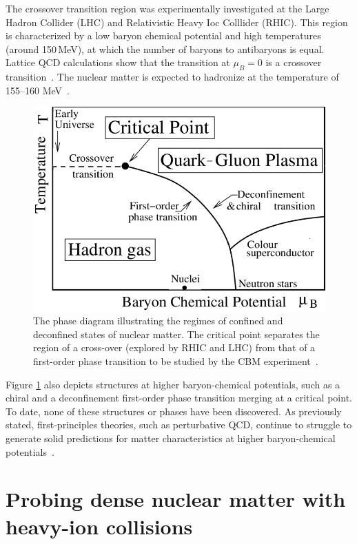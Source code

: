 The crossover transition region was experimentally investigated at the Large Hadron Collider (\gls{LHC}) and Relativistic Heavy Ioc Colllider (\gls{RHIC}). This region is characterized by a low baryon chemical potential and high temperatures (around 150\,MeV), at which the number of baryons to antibaryons is equal. Lattice \gls{QCD} calculations show that the transition at $\mu_{B} = 0$ is a crossover transition~\cite{Aoki_2006}. The nuclear matter is expected to hadronize at the temperature of 155--160 MeV~\cite{Bazavov_2012, Stachel_2014}.



\begin{figure}[!h]
\centering
 \includegraphics[width=0.65\columnwidth]{Chapter1/images/phase.png}
\caption{The phase diagram illustrating the regimes of confined and deconfined states of nuclear matter. The critical point separates the region of a cross-over (explored by \gls{RHIC} and \gls{LHC}) from that of a first-order phase transition to be studied by the CBM experiment~\cite{friese_diagram}.}
\label{fig_phase}
\end{figure}
Figure \ref{fig_phase} also depicts structures at higher baryon-chemical potentials, such as a chiral and a deconfinement first-order phase transition merging at a critical point. To date, none of these structures or phases have been discovered. As previously stated, first-principles theories, such as perturbative QCD, continue to struggle to generate solid predictions for matter characteristics at higher baryon-chemical potentials~\cite{Sakai_2008, Fischer_01, Tawfik_01}. 



\section{Probing dense nuclear matter with heavy-ion collisions}

